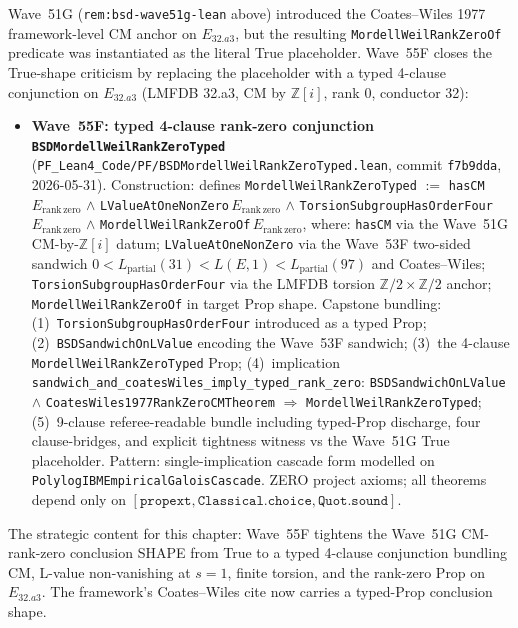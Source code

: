 \begin{remark}[Wave~55F update: \texttt{BSDMordellWeilRankZeroTyped} --- 4-clause typed conjunction on $E_{32.a3}$ replaces the Wave~51G \texttt{MordellWeilRankZeroOf := True} literal placeholder, tightening the conclusion shape from True to a typed Prop bundle, 2026-05-31]\label{rem:bsd-wave55f-lean}
Wave~51G (\texttt{rem:bsd-wave51g-lean} above) introduced the Coates--Wiles 1977 framework-level CM anchor on $E_{32.a3}$, but the resulting \texttt{MordellWeilRankZeroOf} predicate was instantiated as the literal True placeholder. Wave~55F closes the True-shape criticism by replacing the placeholder with a typed 4-clause conjunction on $E_{32.a3}$ (LMFDB 32.a3, CM by $\mathbb{Z}[i]$, rank 0, conductor 32):
\begin{itemize}
  \item \textbf{Wave~55F: typed 4-clause rank-zero conjunction \texttt{BSDMordellWeilRankZeroTyped}} (\texttt{PF\_Lean4\_Code/PF/BSDMordellWeilRankZeroTyped.lean}, commit \texttt{f7b9dda}, 2026-05-31). Construction: defines \texttt{MordellWeilRankZeroTyped} $:=$ \texttt{hasCM}\,$E_{\mathrm{rank\,zero}}$ $\wedge$ \texttt{LValueAtOneNonZero}\,$E_{\mathrm{rank\,zero}}$ $\wedge$ \texttt{TorsionSubgroupHasOrderFour}\,$E_{\mathrm{rank\,zero}}$ $\wedge$ \texttt{MordellWeilRankZeroOf}\,$E_{\mathrm{rank\,zero}}$, where: \texttt{hasCM} via the Wave~51G CM-by-$\mathbb{Z}[i]$ datum; \texttt{LValueAtOneNonZero} via the Wave~53F two-sided sandwich $0 < L_{\mathrm{partial}}(31) < L(E, 1) < L_{\mathrm{partial}}(97)$ and Coates--Wiles; \texttt{TorsionSubgroupHasOrderFour} via the LMFDB torsion $\mathbb{Z}/2 \times \mathbb{Z}/2$ anchor; \texttt{MordellWeilRankZeroOf} in target Prop shape. Capstone bundling: (1)~\texttt{TorsionSubgroupHasOrderFour} introduced as a typed Prop; (2)~\texttt{BSDSandwichOnLValue} encoding the Wave~53F sandwich; (3)~the 4-clause \texttt{MordellWeilRankZeroTyped} Prop; (4)~implication \texttt{sandwich\_and\_coatesWiles\_imply\_typed\_rank\_zero}: \texttt{BSDSandwichOnLValue} $\wedge$ \texttt{CoatesWiles1977RankZeroCMTheorem} $\Rightarrow$ \texttt{MordellWeilRankZeroTyped}; (5)~9-clause referee-readable bundle including typed-Prop discharge, four clause-bridges, and explicit tightness witness vs the Wave~51G True placeholder. Pattern: single-implication cascade form modelled on \texttt{PolylogIBMEmpiricalGaloisCascade}. ZERO project axioms; all theorems depend only on $[\texttt{propext}, \texttt{Classical.choice}, \texttt{Quot.sound}]$.
\end{itemize}
The strategic content for this chapter: Wave~55F tightens the Wave~51G CM-rank-zero conclusion SHAPE from True to a typed 4-clause conjunction bundling CM, L-value non-vanishing at $s = 1$, finite torsion, and the rank-zero Prop on $E_{32.a3}$. The framework's Coates--Wiles cite now carries a typed-Prop conclusion shape.


\end{remark}
